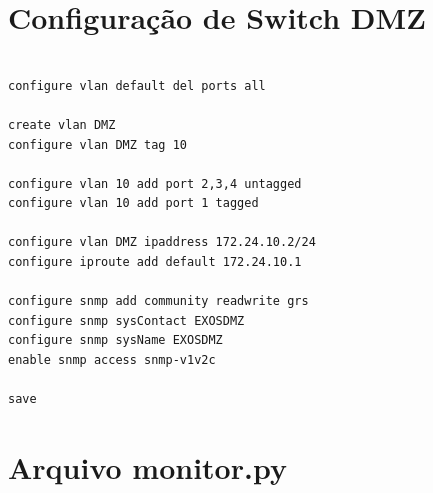 \section{Configuração de Switch DMZ}

\begin{listing}[H]
\centering
\begin{verbatim}

configure vlan default del ports all

create vlan DMZ
configure vlan DMZ tag 10

configure vlan 10 add port 2,3,4 untagged
configure vlan 10 add port 1 tagged

configure vlan DMZ ipaddress 172.24.10.2/24
configure iproute add default 172.24.10.1

configure snmp add community readwrite grs
configure snmp sysContact EXOSDMZ
configure snmp sysName EXOSDMZ
enable snmp access snmp-v1v2c 

save 

\end{verbatim}
\caption{Configuração de Switch EXOS3}
\label{lst:exos3}
\end{listing}

\section{Arquivo monitor.py}

